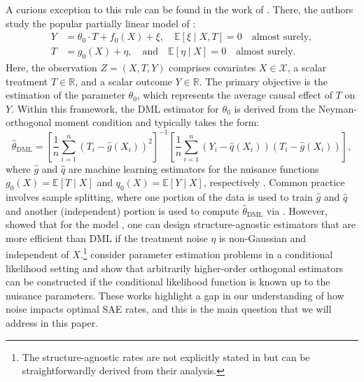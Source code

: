 \documentclass{article}
\def\gX{{\mathcal{X}}}
\newcommand{\E}{\mathbb{E}}
\newcommand{\qtext}[1]{\quad\text{#1}\quad}
\begin{document}
A curious exception to this rule can be found in the work of \citet{mackey2018orthogonal}. There, the authors study the popular partially linear model of \citet{robinson1988root}:
\begin{equation}
    \label{eq:model}
    \begin{aligned}
        Y &= \theta_0\cdot T + f_0(X) + \xi, \quad \E[\xi\mid X,T] = 0 \quad\text{almost surely}, \\
        T &= g_0(X) + \eta, \qtext{and} \E[\eta\mid X] = 0 \quad\text{almost surely}. 
    \end{aligned}
\end{equation}
Here, the observation $Z=(X,T,Y)$ comprises covariates $X \in \gX$, a scalar treatment $T \in \mathbb{R}$, and a scalar outcome $Y \in \mathbb{R}$. The primary objective is the estimation of the parameter $\theta_0$, which represents the average causal effect of $T$ on $Y$. Within this framework, the DML estimator for $\theta_0$ is derived from the Neyman-orthogonal moment condition and typically takes the form: %
\begin{equation}
    \label{eq:dml-estimate}
    \textstyle\hat{\theta}_{\mathrm{DML}} = \left[\frac{1}{n}\sum_{i=1}^n (T_i-\hat{g}(X_i))^2\right]^{-1} \left[ \frac{1}{n}\sum_{i=1}^n (Y_i-\hat{q}(X_i))(T_i-\hat{g}(X_i)) \right],
\end{equation}
where $\hat{g}$ and $\hat{q}$ are machine learning estimators for the nuisance functions $g_0(X) = \mathbb{E}[T \mid X]$ and $q_0(X) = \mathbb{E}[Y \mid X]$, respectively \citep{chernozhukov2018double}. Common practice involves sample splitting, where one portion of the data is used to train $\hat{g}$ and $\hat{q}$ and another (independent) portion is used to compute $\hat{\theta}_{\mathrm{DML}}$ via .
However, \citet{mackey2018orthogonal} showed that for the model , one can design structure-agnostic estimators that are more efficient than DML if the treatment noise $\eta$ is non-Gaussian and independent of $X$.\footnote{The structure-agnostic rates are not explicitly stated in \citet{mackey2018orthogonal} but can be straightforwardly derived from their analysis.} \citet{bonhomme2024neyman} consider parameter estimation problems in a conditional likelihood setting and show that arbitrarily higher-order orthogonal estimators can be constructed if the conditional likelihood function is known up to the nuisance parameters. These works highlight a gap in our understanding of how noise impacts optimal SAE rates, and this is the main question that we will address in this paper. 
\end{document}
